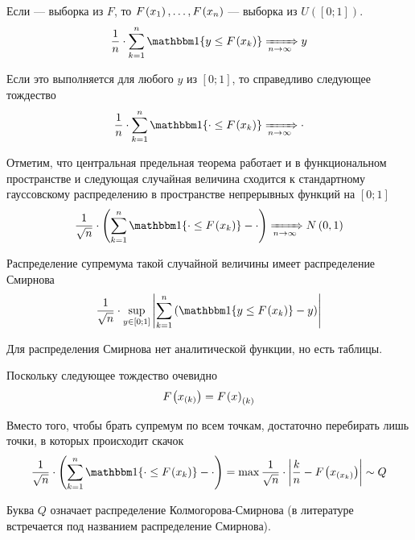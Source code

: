 Если \xsample --- выборка из $F$, то $F_{}\left(x_1\right), \dots, F_{}\left(x_n\right)$
--- выборка из $U\left( \left[ 0; 1 \right] \right)$.
\begin{align*}
  \frac{1}{n} \cdot \sum_{k=1}^{n}\Indicator{y \le \cdf{x_k}}
  \Covergence{} y
\end{align*}

Если это выполняется для любого $y$ из $\left[ 0; 1 \right]$, то справедливо
следующее тождество
\begin{align*}
  \frac{1}{n} \cdot \sum_{k=1}^{n}\Indicator{\cdot \le \cdf{x_k}}
  \Covergence{} \cdot
\end{align*}

Отметим, что центральная предельная теорема работает и в функциональном
пространстве и следующая случайная величина сходится к стандартному гауссовскому
распределению в пространстве непрерывных функций на $\left[ 0; 1 \right]$
\begin{align*}
  \frac{1}{\sqrt{n}} \cdot \left(
      \sum_{k=1}^{n}\Indicator{\cdot \le \cdf{x_k}} - \cdot \right)
  \Covergence{} N\left( 0, 1 \right)
\end{align*}

Распределение супремума такой случайной величины имеет распределение Смирнова
\begin{align*}
  \frac{1}{\sqrt{n}} \cdot \sup\limits_{y \in \left[ 0; 1 \right]}
      {\left| \sum_{k=1}^{n} \left( \Indicator{y \le \cdf{x_k}} - y  \right)
      \right|}
\end{align*}

Для распределения Смирнова нет аналитической функции, но есть таблицы.

Поскольку следующее тождество очевидно
\begin{align*}
  F_{}\left(x_{\left( k \right)}\right) = F_{}\left(x\right)_{\left( k \right)}
\end{align*}

Вместо того, чтобы брать супремум по всем точкам, достаточно перебирать лишь
точки, в которых происходит скачок
\begin{align*}
  \frac{1}{\sqrt{n}} \cdot \left(
      \sum_{k=1}^{n}\Indicator{\cdot \le \cdf{x_k}} - \cdot \right)
  = \max{\frac{1}{\sqrt{n}} \cdot \left| \frac{k}{n}
      - \cdf{x_{\left( x_k \right)}} \right|}
  \sim Q
\end{align*}

Буква $Q$ означает распределение Колмогорова-Смирнова (в литературе встречается
под названием распределение Смирнова).

